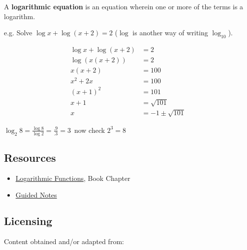 A \textbf{logarithmic equation} is an equation wherein one or more of the terms is a logarithm.



e.g. Solve $\log x + \log (x+2) = 2$ ($\log$ is another way of writing $\log _{10}$).



\begin{align} \log x + \log (x+2) & = 2 \\ \log (x(x+2)) & = 2 \\ x(x+2) & = 100 \\ x^2 + 2x & = 100 \\ (x + 1)^2 & = 101 \\ x+1 & = \sqrt{101} \\ x & = -1 \pm \sqrt{101} \end{align}



$\log _2 8 = \frac { \log 8}{ \log 2} = \frac {.9}{.3} = 3\,$ now check $2^3 = 8\,$




\subsection{Resources}
\label{sss:reso-55b5}




\begin{itemize}
    \item \href{https://mathresearch.utsa.edu/wikiFiles/MAT1053/Logarithmic_Functions/MAT1053_M5.2Logarithmic_Functions.pdf}{Logarithmic Functions}, Book Chapter
    \item \href{https://mathresearch.utsa.edu/wikiFiles/MAT1053/Logarithmic_Functions/MAT1053_M5.2Logarithmic_FunctionsGN.pdf}{Guided Notes}
\end{itemize}


\subsection{Licensing}
\label{sss:lice-7352}




Content obtained and/or adapted from:



